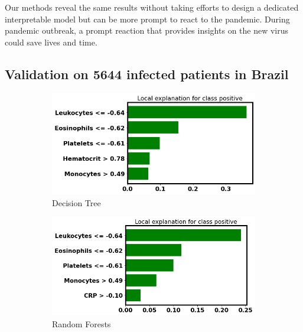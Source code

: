 Our methods reveal the same results without taking efforts to design a dedicated interpretable model but can be more prompt to react to the pandemic. During pandemic outbreak, a prompt reaction that provides insights on the new virus could save lives and time. 

\subsection{Validation on 5644 infected patients in Brazil}

\begin{figure}
\centering
\begin{subfigure}[b]{0.45\textwidth}
    \centering
    \includegraphics[width=\textwidth]{figures/chapter_interp/lime_kaggle_dt.png}
    \caption{Decision Tree}
    \label{fig:lime_kaggle_dt}
\end{subfigure}
\hfill
\begin{subfigure}[b]{0.45\textwidth}
    \centering
    \includegraphics[width=\textwidth]{figures/chapter_interp/lime_kaggle_rf.png}
    \caption{Random Forests}
    \label{fig:lime_kaggle_rf}
\end{subfigure}
\hfill
\begin{subfigure}[b]{0.45\textwidth}

\end{subfigure}
\end{figure}
